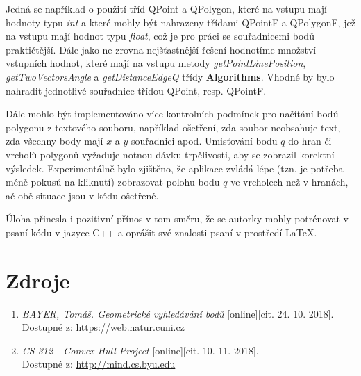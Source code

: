 \documentclass[a4paper, 12pt]{article}
\begin{document}
Jedná se například o použití tříd QPoint a QPolygon, které na vstupu mají hodnoty typu \textit{int} a které mohly být nahrazeny třídami QPointF a QPolygonF, jež na vstupu mají hodnot typu \textit{float}, což je pro práci se souřadnicemi bodů praktičtější. Dále jako ne zrovna nejšťastnější řešení hodnotíme množství vstupních hodnot, které mají na vstupu metody \textit{getPointLinePosition}, \textit{getTwoVectorsAngle} a \textit{getDistanceEdgeQ} třídy \textbf{Algorithms}. Vhodné by bylo nahradit jednotlivé souřadnice třídou QPoint, resp. QPointF. 

Dále mohlo být implementováno více kontrolních podmínek pro načítání bodů polygonu z textového souboru, například ošetření, zda soubor neobsahuje text, zda všechny body mají $x$ a $y$ souřadnici apod. Umisťování bodu $q$ do hran či vrcholů polygonů vyžaduje notnou dávku trpělivosti, aby se zobrazil korektní výsledek. Experimentálně bylo zjištěno, že aplikace zvládá lépe (tzn. je potřeba méně pokusů na kliknutí) zobrazovat polohu bodu $q$ ve vrcholech než v hranách, ač obě situace jsou v kódu ošetřené. 

Úloha přinesla i pozitivní přínos v tom směru, že se autorky mohly potrénovat v psaní kódu v jazyce C++ a oprášit své znalosti psaní v prostředí LaTeX.

\clearpage

\section{Zdroje}
\begin{enumerate}
\item  \textsl{BAYER, Tomáš. Geometrické vyhledávání bodů} [online][cit. 24. 10. 2018]. \\
Dostupné z: \href{https://web.natur.cuni.cz/~bayertom/images/courses/Adk/adk4.pdf}{https://web.natur.cuni.cz}

\item  \textsl{CS 312 - Convex Hull Project} [online][cit. 10. 11. 2018]. \\
Dostupné z: \href{http://mind.cs.byu.edu/courses/312/projects/project2_files/ConvexHull_python.php}{http://mind.cs.byu.edu}

\end{enumerate}
\end{document}
